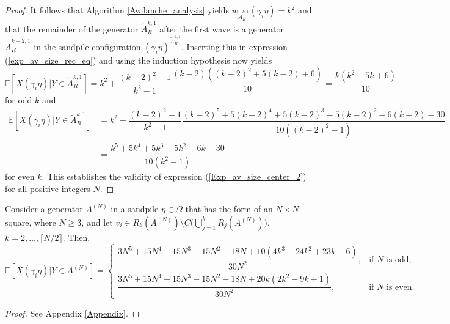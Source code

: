 \documentclass{article}
\begin{document}
\begin{proof}
    It follows that Algorithm \ref{Avalanche_analysis} yields $w_{\tilde{A}_R^{k,1}}(\gamma_i \eta) = k^2$ and that the remainder of the generator $\tilde{A}_R^{k,1}$ after the first wave is a generator $\tilde{A}_R^{k-2,1}$ in the sandpile configuration $(\gamma_i \eta)^{\tilde{A}_R^{k,1}}$. Inserting this in expression (\ref{exp_av_size_rec_eq}) and using the induction hypothesis now yields
    \begin{equation*}
        \mathbb{E}[X(\gamma_i \eta)|Y \in \tilde{A}_R^{k,1}] = k^2 + \dfrac{(k-2)^2-1}{k^2-1} \dfrac{(k-2)((k-2)^2+5(k-2)+6)}{10} = \dfrac{k(k^2 + 5k+6)}{10}
    \end{equation*}
    for odd $k$ and 
    \begin{align*}
        \mathbb{E}[X(\gamma_i \eta)|Y \in \tilde{A}^{k,1}_R] &= k^2 + \dfrac{(k-2)^2-1}{k^2-1} \dfrac{(k-2)^5 + 5(k-2)^4 + 5(k-2)^3-5(k-2)^2-6(k-2)-30}{10((k-2)^2-1)}\\
        &= \dfrac{k^5 + 5k^4 + 5k^3 - 5k^2-6k -30}{10(k^2-1)}
    \end{align*}
    for even $k$. This establishes the validity of expression (\ref{Exp_av_size_center_2}) for all positive integers $N$.  
\end{proof}



\begin{lemma}\label{lem_cornerstones_R}
Consider a generator $A^{(N)}$ in a sandpile $\eta \in \Omega$ that has the form of an $N \times N$ square, where $N \geq 3$, and let $v_i \in R_k(A^{(N)}) \setminus C\big(\bigcup_{j=1}^k R_j(A^{(N)}) \big)$, $k = 2, \ldots, \lceil N/2 \rceil$.  Then,
\begin{equation}\label{Exp_av_size_R}
    \mathbb{E}[X(\gamma_i \eta)|Y \in A^{(N)}] = \begin{cases}
        \dfrac{3N^5+15N^4 + 15N^3-15N^2-18N+10(4k^3  - 24k^2 + 23k -6)}{30N^2}, &\text{if } N \text{ is odd,} \\[1.2em]
        \dfrac{3N^5 + 15N^4 + 15N^3 - 15N^2 - 18N + 20k(2k^2-9k+1)}{30N^2}, &\text{if } N \text{ is even.}
    \end{cases}
\end{equation}
    
\end{lemma}
\begin{proof}
    See Appendix \ref{Appendix}.
\end{proof}

\vspace{5mm}
\end{document}
